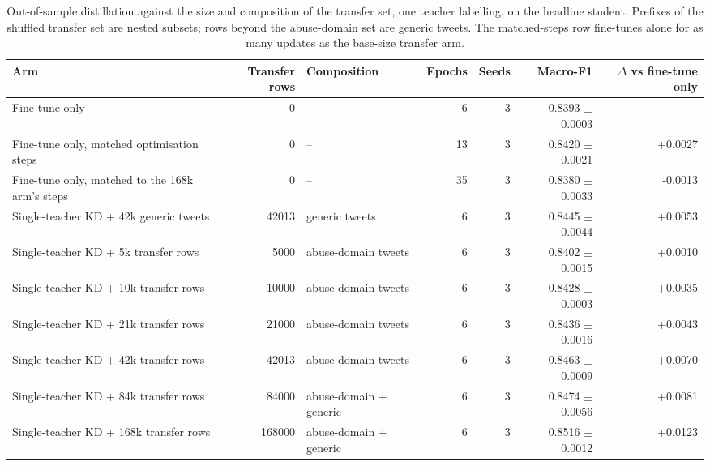 \begin{table}[t]
\centering
\caption{Out-of-sample distillation against the size and composition of the transfer set, one teacher labelling, on the headline student. Prefixes of the shuffled transfer set are nested subsets; rows beyond the abuse-domain set are generic tweets. The matched-steps row fine-tunes alone for as many updates as the base-size transfer arm.}
\label{tab:scaling}
\begin{tabular}{lrlrrrr}
\toprule
Arm & Transfer rows & Composition & Epochs & Seeds & Macro-F1 & $\Delta$ vs fine-tune only \\
\midrule
Fine-tune only & 0 & -- & 6 & 3 & 0.8393 $\pm$ 0.0003 & -- \\
Fine-tune only, matched optimisation steps & 0 & -- & 13 & 3 & 0.8420 $\pm$ 0.0021 & +0.0027 \\
Fine-tune only, matched to the 168k arm's steps & 0 & -- & 35 & 3 & 0.8380 $\pm$ 0.0033 & -0.0013 \\
Single-teacher KD + 42k generic tweets & 42013 & generic tweets & 6 & 3 & 0.8445 $\pm$ 0.0044 & +0.0053 \\
Single-teacher KD + 5k transfer rows & 5000 & abuse-domain tweets & 6 & 3 & 0.8402 $\pm$ 0.0015 & +0.0010 \\
Single-teacher KD + 10k transfer rows & 10000 & abuse-domain tweets & 6 & 3 & 0.8428 $\pm$ 0.0003 & +0.0035 \\
Single-teacher KD + 21k transfer rows & 21000 & abuse-domain tweets & 6 & 3 & 0.8436 $\pm$ 0.0016 & +0.0043 \\
Single-teacher KD + 42k transfer rows & 42013 & abuse-domain tweets & 6 & 3 & 0.8463 $\pm$ 0.0009 & +0.0070 \\
Single-teacher KD + 84k transfer rows & 84000 & abuse-domain + generic & 6 & 3 & 0.8474 $\pm$ 0.0056 & +0.0081 \\
Single-teacher KD + 168k transfer rows & 168000 & abuse-domain + generic & 6 & 3 & 0.8516 $\pm$ 0.0012 & +0.0123 \\
\bottomrule
\end{tabular}
\end{table}